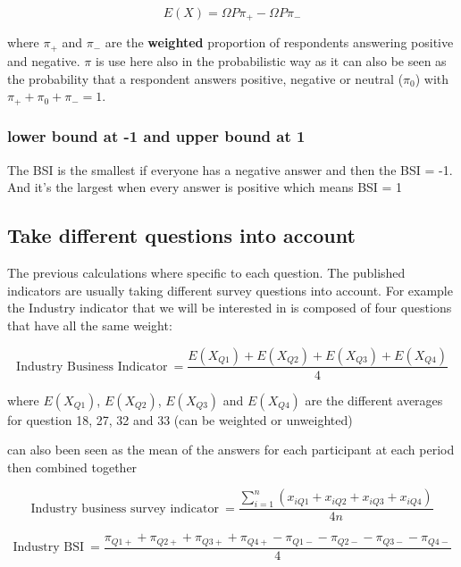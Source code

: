 \documentclass[12pt,a4paper,oneside]{book}
\begin{document}
\begin{equation}
    E(X) = \Omega P \pi_+ - \Omega P \pi_-
\end{equation}

where $\pi_+$ and $\pi_-$ are the \textbf{weighted} proportion of respondents answering positive and negative. $\pi$ is use here also in the probabilistic way as it can also be seen as the probability that a respondent answers positive, negative or neutral ($\pi_0$) with $\pi_+ + \pi_0 + \pi_- =1$.



\subsubsection{lower bound at -1 and upper bound at 1}

The BSI is the smallest if everyone has a negative answer and then the BSI = -1. 
And it's the largest when every answer is positive which means BSI = 1


\subsection{Take different questions into account}

The previous calculations where specific to each question. The published indicators are usually taking different survey questions into account. For example the Industry indicator that we will be interested in is composed of four questions that have all the same weight:

\begin{equation}
    \mbox{Industry Business Indicator}\ = \frac{E(X_{Q1}) + E(X_{Q2}) + E(X_{Q3}) + E(X_{Q4})}{4}
\end{equation}

where 
$E(X_{Q1})$, $E(X_{Q2})$, $E(X_{Q3})$ and $E(X_{Q4})$ are the different averages for question 18, 27, 32 and 33 (can be weighted or unweighted)

can also been seen as the mean of the answers for each participant at each period then combined together

\begin{equation}
    \mbox{Industry business survey indicator}\ = \frac{\sum_{i=1}^n \left(x_{i Q1} + x_{i Q2} + x_{i Q3} + x_{i Q4} \right)}{4n}
\end{equation}

\begin{equation}
    \mbox{Industry BSI}\ = \frac{\pi_{Q1+} + \pi_{Q2+} + \pi_{Q3+} + \pi_{Q4+} - \pi_{Q1-} - \pi_{Q2-} - \pi_{Q3-} - \pi_{Q4-} }{4}
\end{equation}
\end{document}
